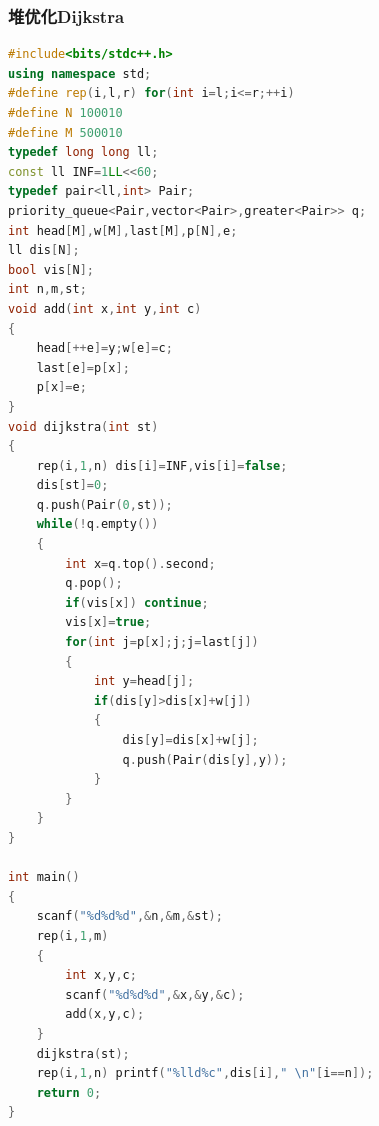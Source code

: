 \documentclass[UTF8,a4paper,titlepage]{ctexart}
\begin{document}
\subsubsection{堆优化Dijkstra}
\begin{lstlisting}[language=C++]
#include<bits/stdc++.h>
using namespace std;
#define rep(i,l,r) for(int i=l;i<=r;++i)
#define N 100010
#define M 500010
typedef long long ll;
const ll INF=1LL<<60;
typedef pair<ll,int> Pair;
priority_queue<Pair,vector<Pair>,greater<Pair>> q;
int head[M],w[M],last[M],p[N],e;
ll dis[N];
bool vis[N];
int n,m,st;
void add(int x,int y,int c)
{
    head[++e]=y;w[e]=c;
    last[e]=p[x];
    p[x]=e;
}
void dijkstra(int st)
{
    rep(i,1,n) dis[i]=INF,vis[i]=false;
    dis[st]=0;
    q.push(Pair(0,st));
    while(!q.empty())
    {
        int x=q.top().second;
        q.pop();
        if(vis[x]) continue;
        vis[x]=true;
        for(int j=p[x];j;j=last[j])
        {
            int y=head[j];
            if(dis[y]>dis[x]+w[j])
            {
                dis[y]=dis[x]+w[j];
                q.push(Pair(dis[y],y));
            }
        }
    }
}

int main()
{
    scanf("%d%d%d",&n,&m,&st);
    rep(i,1,m)
    {
        int x,y,c;
        scanf("%d%d%d",&x,&y,&c);
        add(x,y,c);
    }
    dijkstra(st);
    rep(i,1,n) printf("%lld%c",dis[i]," \n"[i==n]);
    return 0;
}
\end{lstlisting}
\end{document}
